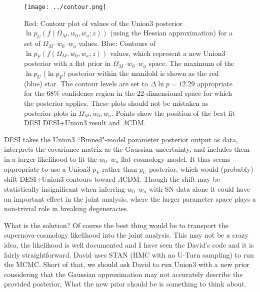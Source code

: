 \documentclass[11pt, oneside]{article}   	%
\begin{document}
\begin{figure}[htbp] %
   \centering
   \texttt{[image: ../contour.png]} 
   \caption{Red: Contour plot of values of the Union3 posterior $\ln{p}_U(f(\Omega_M, w_0, w_a; z))$ (using the Hessian approximation) for a
set of $\Omega_M$--$w_0$--$w_a$ values.
   Blue: Contours of  $\ln{p_F}(f(\Omega_M, w_0, w_a; z))$ values, which represent a new Union3 posterior with a flat prior in  $\Omega_M$--$w_0$--$w_a$ space.   
   The maximum of the $\ln{p}_U$  ($\ln{p}_F)$ posterior within the manifold is shown as the red (blue) star.
   The contour levels are set to $\Delta \ln{p}=12.29$ appropriate for the 68\% confidence region in the 22-dimensional
   space for which the posterior applies. 
   These plots should not be mistaken as posterior plots in  $\Omega_M, w_0, w_a$. 
   Points show the position of the best fit DESI DESI+Union3
   result and  $\Lambda$CDM.}
   \label{fig:posterior}
\end{figure}

DESI takes the Union3 ``Binned"-model parameter posterior output as data, interprets the covariance matrix as the Gaussian uncertainty,
and includes them in a larger likelihood  to fit the $w_0$--$w_a$ flat cosmology model.   It thus seems appropriate
to use a Union3 $p_F$ rather than $p_U$ posterior, which would (probably) shift DESI+Union3 contours toward $\Lambda$CDM.
Though the shift may be statistically insignificant when inferring $w_0$--$w_a$ with SN data alone it could have an important effect in the joint analysis,
where the larger parameter space plays a non-trivial role in breaking degeneracies.

What is the solution? Of course the best thing would be to transport
the supernova-cosmology likelihood into the joint analysis.  This may not be a crazy idea, the likelihood is well documented
and I have seen the David's code and it is fairly straightforward.  David uses STAN  (HMC
with no U-Turn sampling) to run the MCMC.
Short of that, we should ask
David to run Union3 with a new prior considering that the Gaussian approximation may not accurately describe the provided posterior, 
What the new prior should be is something to think about.  
\end{document}
